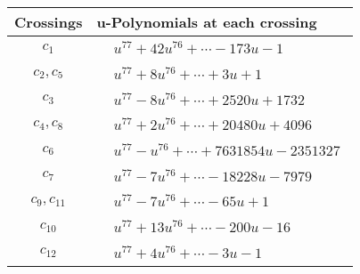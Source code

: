 \documentclass[1p]{elsarticle_modified}
\theoremstyle{definition}
\begin{document}
\begin{tabular}{m{50pt}|m{274pt}}
Crossings & \hspace{64pt}u-Polynomials at each crossing \\
\hline $$\begin{aligned}c_{1}\end{aligned}$$&$\begin{aligned}
&u^{77}+42 u^{76}+\cdots-173 u-1
\end{aligned}$\\
\hline $$\begin{aligned}c_{2},c_{5}\end{aligned}$$&$\begin{aligned}
&u^{77}+8 u^{76}+\cdots+3 u+1
\end{aligned}$\\
\hline $$\begin{aligned}c_{3}\end{aligned}$$&$\begin{aligned}
&u^{77}-8 u^{76}+\cdots+2520 u+1732
\end{aligned}$\\
\hline $$\begin{aligned}c_{4},c_{8}\end{aligned}$$&$\begin{aligned}
&u^{77}+2 u^{76}+\cdots+20480 u+4096
\end{aligned}$\\
\hline $$\begin{aligned}c_{6}\end{aligned}$$&$\begin{aligned}
&u^{77}- u^{76}+\cdots+7631854 u-2351327
\end{aligned}$\\
\hline $$\begin{aligned}c_{7}\end{aligned}$$&$\begin{aligned}
&u^{77}-7 u^{76}+\cdots-18228 u-7979
\end{aligned}$\\
\hline $$\begin{aligned}c_{9},c_{11}\end{aligned}$$&$\begin{aligned}
&u^{77}-7 u^{76}+\cdots-65 u+1
\end{aligned}$\\
\hline $$\begin{aligned}c_{10}\end{aligned}$$&$\begin{aligned}
&u^{77}+13 u^{76}+\cdots-200 u-16
\end{aligned}$\\
\hline $$\begin{aligned}c_{12}\end{aligned}$$&$\begin{aligned}
&u^{77}+4 u^{76}+\cdots-3 u-1
\end{aligned}$\\
\hline
\end{tabular}\\~\\
\end{document}
